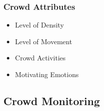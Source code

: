 \subsubsection{Crowd Attributes}

\begin{itemize}
	\item Level of Density
	\item Level of Movement
	\item Crowd Activities
	\item Motivating Emotions
\end{itemize}

\subsection{Crowd Monitoring}










